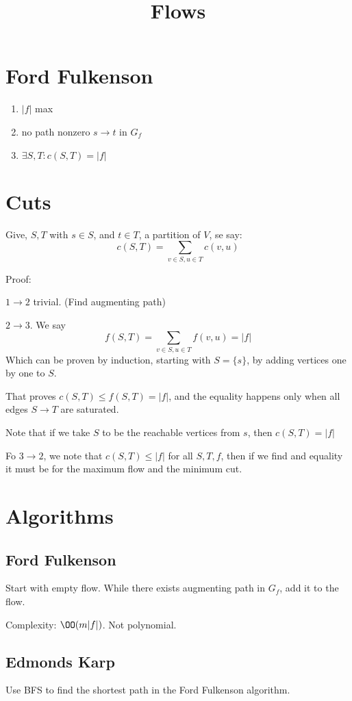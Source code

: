 \documentclass{article}
\title{Flows}
\begin{document}
	\maketitle
	\section*{Ford Fulkenson}
	\begin{enumerate}
		\item $|f|$ max
		\item no path nonzero $s \to t$ in $G_f$
		\item $\exists S,T : c(S,T) = |f|$
	\end{enumerate}
	\section*{Cuts}
	Give, $S, T$ with $s \in S$, and $t \in T$, a partition of $V$, se say:
	\[c(S, T) = \sum_{v \in S, u \in T}c(v, u)\]

	Proof:

	$1 \to 2$ trivial. (Find augmenting path)

	$2 \to 3$. We say 
	\[f(S, T) = \sum_{v \in S, u \in T}f(v, u) = |f|\]
	Which can be proven by induction, starting with $S = \{s\}$, by adding vertices one by one to $S$.

	That proves $c(S,T) \leq f(S,T) = |f|$, and the equality happens only when all edges $S \to T$ are saturated.

	Note that if we take $S$ to be the reachable vertices from $s$, then $c(S,T) = |f|$

	Fo $3 \to 2$, we note that $c(S, T) \leq |f|$ for all $S, T, f$, then if we find and equality it must be for the maximum flow and the minimum cut.

	\section*{Algorithms}
	\subsection*{Ford Fulkenson}
	Start with empty flow. While there exists augmenting path in $G_f$, add it to the flow.

	Complexity: $\OO (m|f|)$. Not polynomial.
	\subsection*{Edmonds Karp}
	Use BFS to find the shortest path in the Ford Fulkenson algorithm.
\end{document}
